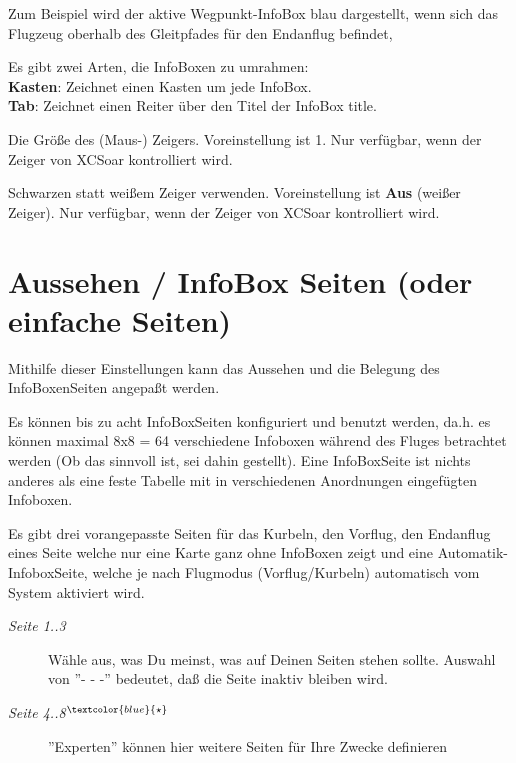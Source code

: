 \begin{description}
Zum Beispiel wird der aktive Wegpunkt-InfoBox  blau dargestellt, wenn sich das Flugzeug oberhalb des Gleitpfades für den Endanflug  befindet,
\item[\textit{InfoBox Rahmen$^{\textcolor{blue}{\star}}$}]  Es gibt zwei Arten, die InfoBoxen zu umrahmen:\\
  {\bf Kasten}: Zeichnet einen Kasten um jede InfoBox.\\
  {\bf Tab}: Zeichnet einen Reiter über den Titel der InfoBox
  title. \\
\item[\textit{Zeigergröße}]  Die Größe des (Maus-) Zeigers. Voreinstellung ist 1.
  Nur verfügbar, wenn der Zeiger von XCSoar kontrolliert wird.
\item[\textit{Schwarzer Zeiger}]  Schwarzen statt weißem Zeiger verwenden. Voreinstellung ist {\bf Aus} (weißer Zeiger).
  Nur verfügbar, wenn der Zeiger von XCSoar kontrolliert wird.
\end{description}


\section{Aussehen / InfoBox Seiten (oder einfache Seiten)}

Mithilfe dieser Einstellungen kann das Aussehen und die Belegung des InfoBoxenSeiten angepaßt werden.

Es können bis zu acht InfoBoxSeiten konfiguriert und benutzt werden, da.h. es können maximal
8x8 = 64 verschiedene Infoboxen während des Fluges betrachtet werden (Ob das sinnvoll ist, sei dahin gestellt).
Eine InfoBoxSeite ist nichts anderes als eine feste Tabelle mit in verschiedenen Anordnungen eingefügten Infoboxen.

Es gibt drei vorangepasste Seiten für das Kurbeln, den Vorflug, den Endanflug eines Seite welche
nur eine Karte ganz ohne InfoBoxen zeigt und eine Automatik- InfoboxSeite, welche je nach Flugmodus
(Vorflug/Kurbeln) automatisch vom System aktiviert wird.

\begin{description}
\item[\textit{Seite  1..3}] Wähle aus, was Du meinst, was auf Deinen Seiten stehen sollte.
       Auswahl von  ''- - -'' bedeutet, daß die Seite inaktiv bleiben wird.
\item[\textit{Seite 4..8$^{\textcolor{blue}{\star}}$}]  ''Experten'' können hier weitere Seiten für Ihre Zwecke definieren
\end{description}




